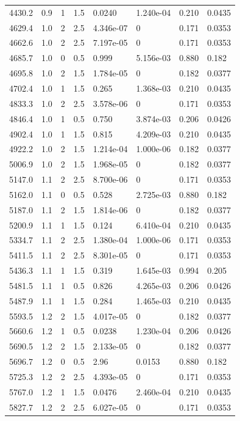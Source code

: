 \documentclass[preview]{standalone}
\begin{document}
{{{\begin{tabular}{L{1.2cm}C{1.2cm} C{0.3cm}C{0.5cm} C{1.4cm}C{1.4cm} C{1.4cm}C{1.4cm}}
  4430.2  &   0.9  & 1     & 1.5 &  0.0240  & 1.240e-04  & 0.210 &  0.0435   \\ 
  4629.4  &   1.0  & 2     & 2.5 &  4.346e-07  & 0  & 0.171 &  0.0353   \\ 
  4662.6  &   1.0  & 2     & 2.5 &  7.197e-05  & 0  & 0.171 &  0.0353   \\ 
  4685.7  &   1.0  & 0     & 0.5 &  0.999  & 5.156e-03  & 0.880 &  0.182   \\ 
  4695.8  &   1.0  & 2     & 1.5 &  1.784e-05  & 0  & 0.182 &  0.0377   \\ 
  4702.4  &   1.0  & 1     & 1.5 &  0.265  & 1.368e-03  & 0.210 &  0.0435   \\ 
  4833.3  &   1.0  & 2     & 2.5 &  3.578e-06  & 0  & 0.171 &  0.0353   \\ 
  4846.4  &   1.0  & 1     & 0.5 &  0.750  & 3.874e-03  & 0.206 &  0.0426   \\ 
  4902.4  &   1.0  & 1     & 1.5 &  0.815  & 4.209e-03  & 0.210 &  0.0435   \\ 
  4922.2  &   1.0  & 2     & 1.5 &  1.214e-04  & 1.000e-06  & 0.182 &  0.0377   \\ 
  5006.9  &   1.0  & 2     & 1.5 &  1.968e-05  & 0  & 0.182 &  0.0377   \\ 
  5147.0  &   1.1  & 2     & 2.5 &  8.700e-06  & 0  & 0.171 &  0.0353   \\ 
  5162.0  &   1.1  & 0     & 0.5 &  0.528  & 2.725e-03  & 0.880 &  0.182   \\ 
  5187.0  &   1.1  & 2     & 1.5 &  1.814e-06  & 0  & 0.182 &  0.0377   \\ 
  5200.9  &   1.1  & 1     & 1.5 &  0.124  & 6.410e-04  & 0.210 &  0.0435   \\ 
  5334.7  &   1.1  & 2     & 2.5 &  1.380e-04  & 1.000e-06  & 0.171 &  0.0353   \\ 
  5411.5  &   1.1  & 2     & 2.5 &  8.301e-05  & 0  & 0.171 &  0.0353   \\ 
  5436.3  &   1.1  & 1     & 1.5 &  0.319  & 1.645e-03  & 0.994 &  0.205   \\ 
  5481.5  &   1.1  & 1     & 0.5 &  0.826  & 4.265e-03  & 0.206 &  0.0426   \\ 
  5487.9  &   1.1  & 1     & 1.5 &  0.284  & 1.465e-03  & 0.210 &  0.0435   \\ 
  5593.5  &   1.2  & 2     & 1.5 &  4.017e-05  & 0  & 0.182 &  0.0377   \\ 
  5660.6  &   1.2  & 1     & 0.5 &  0.0238  & 1.230e-04  & 0.206 &  0.0426   \\ 
  5690.5  &   1.2  & 2     & 1.5 &  2.133e-05  & 0  & 0.182 &  0.0377   \\ 
  5696.7  &   1.2  & 0     & 0.5 &  2.96  & 0.0153  & 0.880 &  0.182   \\ 
  5725.3  &   1.2  & 2     & 2.5 &  4.393e-05  & 0  & 0.171 &  0.0353   \\ 
  5767.0  &   1.2  & 1     & 1.5 &  0.0476  & 2.460e-04  & 0.210 &  0.0435   \\ 
  5827.7  &   1.2  & 2     & 2.5 &  6.027e-05  & 0  & 0.171 &  0.0353   \\ 
\hline 
\end{tabular} 

}}}
\end{document}
